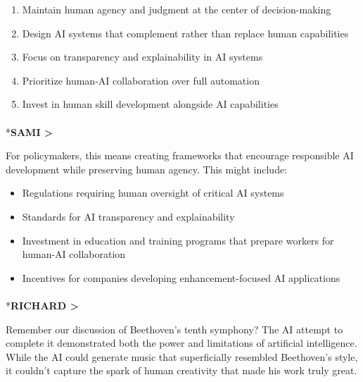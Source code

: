 \documentclass[
  Letterpaper,
]{scrbook}
\makeatletter
\let\oldparagraph\paragraph
\renewcommand{\paragraph}{
    \@ifstar
      \xxxParagraphStar
      \xxxParagraphNoStar
  }
\newcommand{\xxxParagraphStar}[1]{\oldparagraph*{#1}\mbox{}}
\newcommand{\xxxParagraphNoStar}[1]{\oldparagraph{#1}\mbox{}}
\providecommand{\tightlist}{%
  \setlength{\itemsep}{0pt}\setlength{\parskip}{0pt}}\usepackage{longtable,booktabs,array}
\makeatother
\begin{document}
\begin{enumerate}
\def\labelenumi{\arabic{enumi}.}
\tightlist
\item
  Maintain human agency and judgment at the center of decision-making
\item
  Design AI systems that complement rather than replace human
  capabilities
\item
  Focus on transparency and explainability in AI systems
\item
  Prioritize human-AI collaboration over full automation
\item
  Invest in human skill development alongside AI capabilities
\end{enumerate}

\paragraph*{\texorpdfstring{\textbf{SAMI
\textgreater{}}}{SAMI \textgreater{}}}\label{sami-2}

For policymakers, this means creating frameworks that encourage
responsible AI development while preserving human agency. This might
include:

\begin{itemize}
\tightlist
\item
  Regulations requiring human oversight of critical AI systems
\item
  Standards for AI transparency and explainability
\item
  Investment in education and training programs that prepare workers for
  human-AI collaboration
\item
  Incentives for companies developing enhancement-focused AI
  applications
\end{itemize}

\paragraph*{\texorpdfstring{\textbf{RICHARD
\textgreater{}}}{RICHARD \textgreater{}}}\label{richard-3}

Remember our discussion of Beethoven's tenth symphony? The AI attempt to
complete it demonstrated both the power and limitations of artificial
intelligence. While the AI could generate music that superficially
resembled Beethoven's style, it couldn't capture the spark of human
creativity that made his work truly great.
\end{document}
